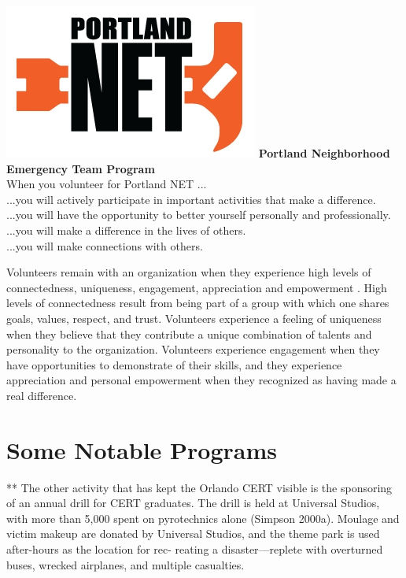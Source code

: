 \documentclass[11pt,fleqn]{book} %
\begin{document}
{\begin{minipage} [t][][c]{0.80\linewidth}
\includegraphics[scale=0.25]{graphics/NET_logo.jpg}
\textbf{Portland Neighborhood Emergency Team Program}\\
 When you volunteer for Portland NET ...\\
...you will actively participate in important activities that make a difference.\\
...you will have the opportunity to better yourself personally and professionally.\\
...you will make a difference in the lives of others.\\
...you will make connections with others.
 \end{minipage}
}

\noindent Volunteers remain with an organization when they experience high levels of connectedness, uniqueness, engagement, appreciation and empowerment \autocite{shields_young_2009}. High levels of connectedness result from being part of a group with which one shares goals, values, respect, and trust. Volunteers experience a feeling of uniqueness when they believe that they contribute a unique combination of talents and personality to the organization. Volunteers experience engagement when they have opportunities to demonstrate of their skills, and they experience appreciation and personal empowerment when they recognized as having made a real difference. \\



\vspace{2em}
\section{Some Notable Programs}
\vspace{1em}

\autocite{simpson_community_2001}
** The other activity that has kept the Orlando CERT visible is the
sponsoring of an annual drill for CERT graduates. The
drill is held at Universal Studios, with more than 5,000
spent on pyrotechnics alone (Simpson 2000a). Moulage
and victim makeup are donated by Universal Studios, and
the theme park is used after-hours as the location for rec-
reating a disaster—replete with overturned buses,
wrecked airplanes, and multiple casualties.
\end{document}
